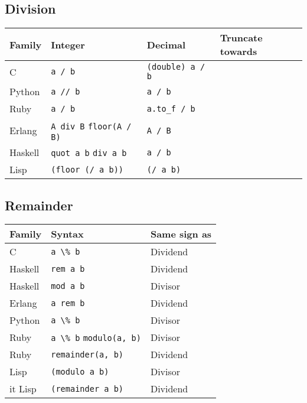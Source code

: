 \documentclass{article}
\begin{document}
\subsection{Division}
\begin{longtabu} to 0.75\linewidth { X X X X }
	Family & Integer & Decimal & Truncate towards \\
	\hline
	C & \lstinline$a / b$ & \lstinline$(double) a / b$ & \\
	Python & \lstinline$a // b$ & \lstinline$a / b$ & \\
	Ruby & \lstinline$a / b$ & \lstinline$a.to_f / b$ & \\
	Erlang & \lstinline$A div B$ \newline \lstinline$floor(A / B)$ & \lstinline$A / B$ & \\
	Haskell & \lstinline$quot a b$ \newline \lstinline$div a b$ & \lstinline$a / b$ & \\
	Lisp & \lstinline$(floor (/ a b))$ & \lstinline$(/ a b)$ & \\
\end{longtabu}

\subsection{Remainder}
\begin{longtabu} to 0.75\linewidth { X X X }
	Family & Syntax & Same sign as \\
	\hline
	C & \lstinline$a \% b$ & Dividend \\
	Haskell & \lstinline$rem a b$ & Dividend \\
	Haskell & \lstinline$mod a b$ & Divisor \\
	Erlang & \lstinline$a rem b$ & Dividend \\
	Python & \lstinline$a \% b$ & Divisor \\
	Ruby & \lstinline$a \% b$ \newline \lstinline$modulo(a, b)$ & Divisor \\
	Ruby & \lstinline$remainder(a, b)$ & Dividend \\
	Lisp & \lstinline$(modulo a b)$ & Divisor \\it
	Lisp & \lstinline$(remainder a b)$ & Dividend \\

\end{longtabu}
\end{document}
